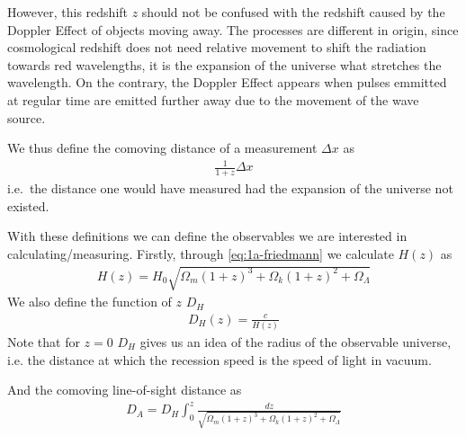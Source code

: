 However, this redshift $z$ should not be confused with the redshift caused by the Doppler Effect of objects moving away. The processes are different in origin, since cosmological redshift does not need relative movement to shift the radiation towards red wavelengths, it is the expansion of the universe what stretches the wavelength. On the contrary, the Doppler Effect appears when pulses emmitted at regular time are emitted further away due to the movement of the wave source.

We thus define the comoving distance of a measurement $\Delta x$ as 
\begin{align}
	\frac{1}{1+z}\Delta x
\end{align}
i.e.\ the distance one would have measured had the expansion of the universe not existed.

With these definitions we can define  the observables we are interested in calculating/measuring. Firstly, through \eqref{eq:1a-friedmann} we calculate $H(z)$ as  
\begin{align}
	H(z) = H_0 \sqrt{\Omega_m(1+z)^3 + \Omega_k(1+z)^2 + \Omega_\Lambda} 
\end{align}
We also define the function of $z$ $D_H$
\begin{align}
	D_H(z)  = \frac{c}{H(z)}
\end{align}
Note that for $z = 0$ $D_H$ gives us an idea of the radius of the observable universe, i.e. the distance at which the recession speed is the speed of light in vacuum.

And the comoving line-of-sight distance as 
\begin{align}
	D_A = D_H\int_{0}^{z} \frac{dz}{\sqrt{\Omega_m(1+z)^3 + \Omega_k(1+z)^2 + \Omega_\Lambda} } 
\end{align}
